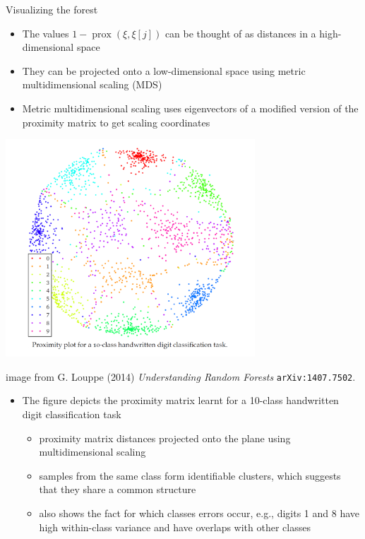 \documentclass[11pt,compress,t,notes=noshow, xcolor=table]{beamer}
\begin{document}
\begin{vbframe}{Visualizing the forest}

\begin{itemize}
  \item The values $1 - \operatorname{prox}\left(\xi, \xi[j]\right)$ can be thought of as distances in a high-dimensional space
  \item They can be projected onto a low-dimensional space using metric multidimensional scaling (MDS)
  \item Metric multidimensional scaling uses eigenvectors of a modified version of the proximity matrix to get scaling coordinates
\end{itemize}

\framebreak

\begin{center}
\includegraphics[width=0.7\textwidth]{figure_man/Proximity_plot.png}
\end{center}
\tiny image from G. Louppe (2014) \emph{Understanding Random Forests} \texttt{arXiv:1407.7502}. 

\framebreak

\begin{itemize}
  \item \normalsize The figure depicts the proximity matrix learnt for a 10-class handwritten digit classification task
  \begin{itemize}
  \item proximity matrix distances projected onto the plane using multidimensional scaling
  \item samples from the same class form identifiable clusters, which suggests that they share a common structure
  \item also shows the fact for which classes errors occur, e.g.,  digits 1 and 8 have high within-class variance and have overlaps with other classes 
  \end{itemize}
\end{itemize}

\end{vbframe}
\end{document}
